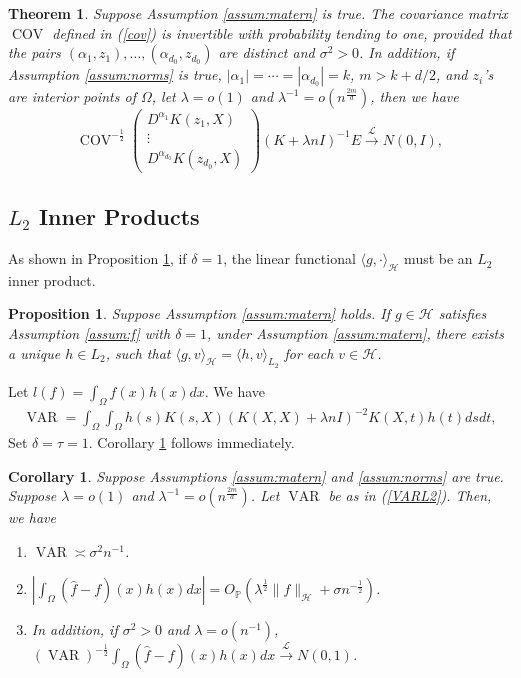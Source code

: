 \documentclass[12pt]{article}
\theoremstyle{plain}
\newtheorem{theorem}{Theorem}
\newtheorem{proposition}{Proposition}
\newtheorem{corollary}{Corollary}
\theoremstyle{remark}
\begin{document}
\begin{theorem}\label{Th:multivariateAN}
Suppose Assumption \ref{assum:matern} is true. The covariance matrix $\operatorname{COV}$ defined in (\ref{cov}) is invertible with probability tending to one, provided that the pairs $(\alpha_1,z_1),\ldots,(\alpha_{d_0},z_{d_0})$ are distinct and $\sigma^2>0$.
    In addition, if Assumption \ref{assum:norms} is true, $|\alpha_1|=\cdots=|\alpha_{d_0}|=k$, $m>k+d/2$, and $z_i$'s are interior points of $\Omega$,  let $\lambda=o(1)$ and $\lambda^{-1}=o(n^{\frac{2m}{d}})$, then we have 
    \[\operatorname{COV}^{-\frac{1}{2}}
    \begin{pmatrix}
        D^{\alpha_1} K(z_1,X)\\
        \vdots\\
        D^{\alpha_{d_0}}K(z_{d_0},X)
    \end{pmatrix}(K+\lambda n I)^{-1}E\xrightarrow{\mathscr{L}}N(0,I),\]
\end{theorem}

\subsection{\texorpdfstring{$L_2$}{Lg}  Inner Products}

As shown in Proposition \ref{prop:L2}, if $\delta=1$, the linear functional $\langle g,\cdot\rangle_\mathcal{H}$ must be an $L_2$ inner product.

\begin{proposition}\label{prop:L2}
Suppose Assumption \ref{assum:matern} holds.
    If $g\in\mathcal{H}$ satisfies Assumption \ref{assum:f} with $\delta=1$, under Assumption \ref{assum:matern}, there exists a unique $h\in L_2$, such that $\langle g,v\rangle_{\mathcal{H}}=\langle h,v\rangle_{L_2}$ for each $v\in\mathcal{H}$.
\end{proposition}

Let $l(f)=\int_\Omega f(x)h(x)dx$. We have
\begin{eqnarray}\label{VARL2}
    \operatorname{VAR}=\int_\Omega\int_\Omega h(s) K(s,X)(K(X,X)+\lambda n I)^{-2} K(X,t) h(t)ds dt,
\end{eqnarray}
Set $\delta=\tau=1$. Corollary \ref{Coro:L2} follows immediately.

\begin{corollary}\label{Coro:L2}
    Suppose Assumptions \ref{assum:matern} and \ref{assum:norms} are true. Suppose $\lambda=o(1)$ and $\lambda^{-1}=o(n^{\frac{2m}{d}})$. Let $\operatorname{VAR}$ be as in (\ref{VARL2}). Then, we have
    \begin{enumerate}
        \item $\operatorname{VAR}\asymp \sigma^2 n^{-1}$.
        \item $|\int_\Omega (\hat{f}-f)(x)h(x)dx| =O_\mathbb{P}( \lambda^{\frac{1}{2}}\|f\|_\mathcal{H}+\sigma n^{-\frac{1}{2}})$.
        \item In addition, if $\sigma^2>0$ and $\lambda=o(n^{-1})$, $(\operatorname{VAR})^{-\frac{1}{2}}\int_\Omega (\hat{f}-f)(x)h(x)dx\xrightarrow{\mathscr{L}}N(0,1)$.
    \end{enumerate}
\end{corollary}
\end{document}
